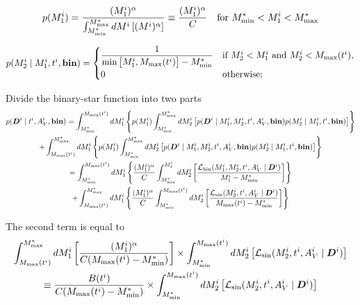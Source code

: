 \documentclass[a4paper,fleqn,usenatbib,onecolumn]{mnras}
\begin{document}
\begin{equation}
p(M_1^i) = \dfrac{(M_1^i)^\alpha}{\int_{M^\ast_{\rm min}}^{M^\ast_{\rm max}} dM^i \left[ (M^i)^\alpha \right]} \equiv \dfrac{(M_1^i)^\alpha}{C} \ \ \ \text{for $M^\ast_{\rm min} < M_1^i < M^\ast_{\rm max}$}
\end{equation}

\begin{equation}
p(M_2^i \mid  M_1^i, t^i, {\rm \bf bin}) =
\begin{cases}
\dfrac{1}{{\rm min} \left[ M_1^i, M_{\rm max}(t^i) \right] - M^\ast_{\rm min}} & \text{if $M_2^i < M_1^i$ and $M_2^i < M_{\rm max}(t^i)$}, \\
0 & \text{otherwise};
\end{cases}
\end{equation}

Divide the binary-star function into two parts
\begin{multline}
p(\bm{D}^i \mid t^i, A_V^i, {\rm \bf bin}) = \int_{M^\ast_{\rm min}}^{M_{\rm max}(t^i)} dM_1^i \left\{ p(M_1^i) \int_{M^\ast_{\rm min}}^{M^\ast_{\rm max}} dM_2^i\left[ p(\bm{D}^i \mid M_1^i, M_2^i, t^i, A_V^i, {\rm \bf bin}) p(M_2^i \mid  M_1^i, t^i, {\rm \bf bin}) \right] \right\} \\
+ \int_{M_{\rm max}(t^i)}^{M^{\ast}_{\rm max}} dM_1^i \left\{ p(M_1^i) \int_{M^\ast_{\rm min}}^{M^\ast_{\rm max}} dM_2^i\left[ p(\bm{D}^i \mid M_1^i, M_2^i, t^i, A_V^i, {\rm \bf bin}) p(M_2^i \mid  M_1^i, t^i, {\rm \bf bin}) \right] \right\} \\
= \int_{M^\ast_{\rm min}}^{M_{\rm max}(t^i)} dM_1^i \left\{ \dfrac{(M_1^i)^\alpha}{C} \int_{M^\ast_{\rm min}}^{M_1^i} dM_2^i\left[ \dfrac{\mathcal{L}_{\rm bin}(M_1^i, M_2^i, t^i, A_V^i \mid \bm{D}^i)}{M_1^i - M^\ast_{\rm min}} \right] \right\} \\
+ \int_{M_{\rm max}(t^i)}^{M^{\ast}_{\rm max}} dM_1^i \left\{ \dfrac{(M_1^i)^\alpha}{C} \int_{M^\ast_{\rm min}}^{M_{\rm max}(t^i)} dM_2^i\left[ \dfrac{\mathcal{L}_{\rm sin}(M_2^i, t^i, A_V^i \mid \bm{D}^i)}{M_{\rm max}(t^i) - M^\ast_{\rm min}} \right] \right\}
\end{multline}

The second term is equal to
\begin{multline}
\int_{M_{\rm max}(t^i)}^{M^{\ast}_{\rm max}} dM_1^i \left[ \dfrac{(M_1^i)^\alpha}{C(M_{\rm max}(t^i) - M^\ast_{\rm min})} \right] \times \int_{M^\ast_{\rm min}}^{M_{\rm max}(t^i)} dM_2^i\left[ \mathcal{L}_{\rm sin}(M_2^i, t^i, A_V^i \mid \bm{D}^i) \right] \\
\equiv \dfrac{B(t^i)}{C(M_{\rm max}(t^i) - M^\ast_{\rm min})} \times \int_{M^\ast_{\rm min}}^{M_{\rm max}(t^i)} dM_2^i\left[ \mathcal{L}_{\rm sin}(M_2^i, t^i, A_V^i \mid \bm{D}^i) \right]
\end{multline}
\end{document}
